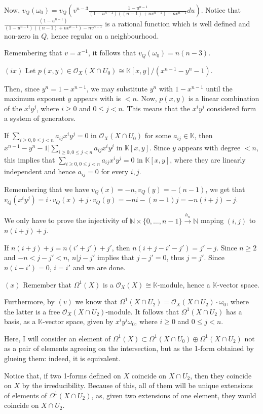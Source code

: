 \documentclass{article}
\newcommand{\numberset}{\mathbb}
\newcommand{\N}{\numberset{N}}
\newcommand{\K}{\numberset{K}}
\begin{document}
Now, $v_Q(\omega_0)=v_Q(v^{n-3}\frac{1-u^{n-1}}{(1-u^{n-1})((n-1)+nv^{n-1})-nv^{n-1}}du)$. Notice that $\frac{(1-u^{n-1})}{(1-u^{n-1})((n-1)+nv^{n-1})-nv^{n-1}}$ is a rational function which is well defined and non-zero in $Q$, hence regular on a neighbourhood.

Remembering that $v=x^{-1}$, it follows that $v_Q(\omega_0)=n(n-3)$.

$(ix)$ Let $p(x,y)\in\mathcal{O}_X(X\cap U_0)\cong\K[x,y]/(x^{n-1}-y^n-1)$.

Then, since $y^n=1-x^{n-1}$, we may substitute $y^n$ with $1-x^{n-1}$ until the maximum exponent $y$ appears with is $<n$. Now, $p(x,y)$ is a linear combination of the $x^iy^j$, where $i\geq 0$ and $0\leq j<n$. This means that the $x^iy^j$ considered form a system of generators.

If $\sum_{i\geq 0,0\leq j<n} a_{ij}x^iy^j=0$ in $\mathcal{O}_X(X\cap U_0)$ for some $a_{ij}\in\K$, then $x^{n-1}-y^n-1|\sum_{i\geq 0,0\leq j<n} a_{ij}x^iy^j$ in $\K[x,y]$. Since $y$ appears with degree $<n$, this implies that $\sum_{i\geq 0,0\leq j<n} a_{ij}x^iy^j=0$ in $\K[x,y]$, where they are linearly independent and hence $a_{ij}=0$ for every $i,j$.

Remembering that we have $v_Q(x)=-n,v_Q(y)=-(n-1)$, we get that $v_Q(x^iy^j)=i\cdot v_Q(x)+j\cdot v_Q(y)=-ni-(n-1)j=-n(i+j)-j$.

We only have to prove the injectivity of $\N\times\{0,\ldots,n-1\}\xrightarrow{h_n}\N$ maping $(i,j)$ to $n(i+j)+j$.

If $n(i+j)+j=n(i'+j')+j'$, then $n(i+j-i'-j')=j'-j$. Since $n\geq 2$ and $-n<j-j'<n$, $n|j-j'$ implies that $j-j'=0$, thus $j=j'$. Since $n(i-i')=0$, $i=i'$ and we are done.

$(x)$ Remember that $\Omega^1(X)$ is a $\mathcal{O}_X(X)\cong\K$-module, hence a $\K$-vector space.

Furthermore, by $(v)$ we know that $\Omega^1(X\cap U_2)=\mathcal{O}_X(X\cap U_2)\cdot\omega_0$, where the latter is a free $\mathcal{O}_X(X\cap U_2)$-module. It follows that $\Omega^1(X\cap U_2)$ has a basis, as a $\K$-vector space, given by $x^iy^j\omega_0$, where $i\geq 0$ and $0\leq j<n$.

Here, I will consider an element of $\Omega^1(X)\subset\Omega^1(X\cap U_0)\oplus\Omega^1(X\cap U_2)$ not as a pair of elements agreeing on the intersection, but as the 1-form obtained by glueing them: indeed, it is equivalent.

Notice that, if two 1-forms defined on $X$ coincide on $X\cap U_2$, then they coincide on $X$ by the irreducibility. Because of this, all of them will be unique extensions of elements of $\Omega^1(X\cap U_2)$, as, given two extensions of one element, they would coincide on $X\cap U_2$.
\end{document}
